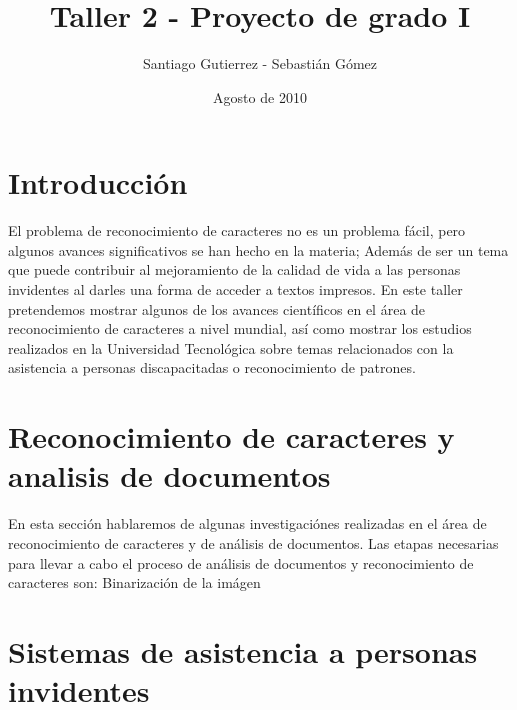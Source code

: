 \documentclass{article}
\begin{document}
\title {Taller 2 - Proyecto de grado I}
\author { Santiago Gutierrez - Sebastián G\'omez }
\date {Agosto de 2010}
\maketitle

	\section{Introducci\'on}
	El problema de reconocimiento de caracteres no es un problema f\'acil, pero algunos
	avances significativos se han hecho en la materia; Adem\'as de ser un tema que puede
	contribuir al mejoramiento de la calidad de vida a las personas invidentes al darles
	una forma de acceder a textos impresos.
	En este taller pretendemos mostrar algunos de los avances cient\'ificos en el \'area
	de reconocimiento de caracteres a nivel mundial, as\'i como mostrar los estudios
	realizados en la Universidad Tecnol\'ogica sobre temas relacionados con la asistencia
	a personas discapacitadas o reconocimiento de patrones.
	
	\section{Reconocimiento de caracteres y analisis de documentos}
	En esta secci\'on hablaremos de algunas investigaci\'ones realizadas en el \'area
	de reconocimiento de caracteres y de an\'alisis de documentos.
	Las etapas necesarias para llevar a cabo el proceso de an\'alisis de documentos
	y reconocimiento de caracteres son: Binarizaci\'on de la im\'agen
	
	\section{Sistemas de asistencia a personas invidentes}
\end{document}
